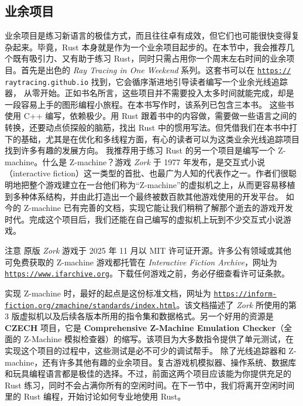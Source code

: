 \subsection{业余项目}
\label{idx:idx_3789bcae}
业余项目是练习新语言的极佳方式，而且往往卓有成效，但它们也可能很快变得复杂起来。毕竟，Rust 本身就是作为一个业余项目起步的。在本节中，我会推荐几个既有吸引力、又有助于练习 Rust，同时只需占用你一个周末左右时间的业余项目。首先是出色的 \emph{Ray Tracing in One Weekend} 系列。这套书可以在 \href{https://}{\texttt{https://}}
\texttt{raytracing.\allowbreak{}github.\allowbreak{}io} 找到，它会循序渐进地引导读者编写一个业余光线追踪器，
从零开始。正如书名所言，这些项目并不需要投入太多时间就能完成，却是一段容易上手的图形编程小旅程。在本书写作时，该系列已包含三本书。
这些书使用 C++ 编写，依赖极少。用 Rust 跟着书中的内容做，需要做一些语言之间的转换，还要动点侦探般的脑筋，找出 Rust 中的惯用写法。但凭借我们在本书中打下的基础，尤其是在优化和多线程方面，有心的读者可以为这类业余光线追踪项目找到许多有趣的发展方向。
我推荐用于练习 Rust 的另一个项目是编写一个 Z-\allowbreak{}machine。什么是 Z-\allowbreak{}machine？游戏 \emph{Zork} 于 1977 年发布，是交互式小说（interactive fiction）这一类型的首批、也最广为人知的代表作之一。作者们很聪明地把整个游戏建立在一台他们称为“Z-\allowbreak{}machine”的虚拟机之上，从而更容易移植到多种体系结构，并由此打造出一个最终被数百款其他游戏使用的开发平台。
如今的 Z-\allowbreak{}machine 已有完善的文档，实现它能让我们稍稍了解那个逝去的游戏开发时代。完成这个项目后，我们还能在自己编写的虚拟机上玩到不少交互式小说游戏。
\begin{myNotic}{注意}
原版 \emph{Zork} 游戏于 2025 年 11 月以 MIT 许可证开源。许多公有领域或其他可免费获取的 Z-\allowbreak{}machine 游戏都托管在 \emph{Interactive Fiction Archive}，网址为 \href{https://www.ifarchive.org}{\texttt{https:/\allowbreak{}/\allowbreak{}www.\allowbreak{}ifarchive.\allowbreak{}org}}。下载任何游戏之前，务必仔细查看许可证条款。
\end{myNotic}
\label{idx:idx_88c76f2f}
实现 Z-\allowbreak{}machine 时，最好的起点是这份标准文档，网址为 \href{https://inform-fiction.org/zmachine/standards/index.html}{\texttt{https:/\allowbreak{}/\allowbreak{}inform-\allowbreak{}fiction.\allowbreak{}org/\allowbreak{}zmachine/\allowbreak{}standards/\allowbreak{}index.\allowbreak{}html}}。该文档描述了 \emph{Zork} 所使用的第 3 版虚拟机以及后续各版本所用的指令集和数据格式。另一个好用的资源是 \textbf{CZECH} 项目，它是 \textbf{Comprehensive Z-\allowbreak{}Machine Emulation Checker}（全面的 Z-\allowbreak{}Machine 模拟检查器）的缩写。该项目为大多数指令提供了单元测试，在实现这个项目的过程中，这些测试是必不可少的调试帮手。
\label{idx:idx_90d8918f}
除了光线追踪器和 Z-\allowbreak{}machine，还有许多其他有趣的业余项目。复古游戏机模拟器、操作系统、数据库和玩具编程语言都是极佳的选择。不过，前面这两个项目应该能为你提供充足的 Rust 练习，同时不会占满你所有的空闲时间。在下一节中，我们将离开空闲时间里的 Rust 编程，开始讨论如何专业地使用 Rust。
